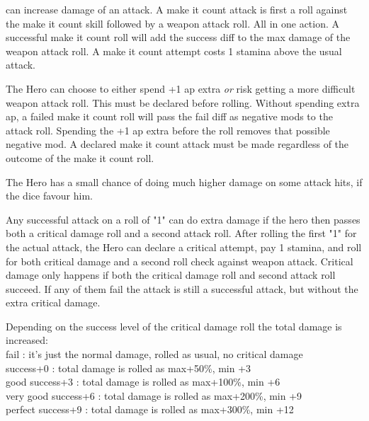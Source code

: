 


 can increase damage of an attack. A make it count attack is first a roll against the make it count skill followed by a weapon attack roll. All in one action. A successful make it count roll will add the success diff to the max damage of the weapon attack roll. A make it count attempt costs 1 stamina above the usual attack.

The Hero can choose to either spend +1 ap extra \emph{or} risk getting a more difficult weapon attack roll. This must be declared before rolling. Without spending extra ap, a failed make it count roll will pass the fail diff as negative mods to the attack roll. Spending the +1 ap extra before the roll removes that possible negative mod. A declared make it count attack must be made regardless of the outcome of the make it count roll.


 The Hero has a small chance of doing much higher damage on some attack hits, if the dice favour him.

Any successful attack on a roll of "1" can do extra damage if the hero then passes both a critical damage roll and a second attack roll. After rolling the first "1" for the actual attack, the Hero can declare a critical attempt, pay 1 stamina, and roll for both critical damage and a second roll check against weapon attack. Critical damage only happens if both the critical damage roll and second attack roll succeed. If any of them fail the attack is still a successful attack, but without the extra critical damage.

Depending on the success level of the critical damage roll the total damage is increased:\\
fail : it's just the normal damage, rolled as usual, no critical damage \\
success+0 : total damage is rolled as max+50\%, min +3 \\
good success+3 : total damage is rolled as max+100\%, min +6 \\
very good success+6 : total damage is rolled as max+200\%, min +9 \\
perfect success+9 : total damage is rolled as max+300\%, min +12


